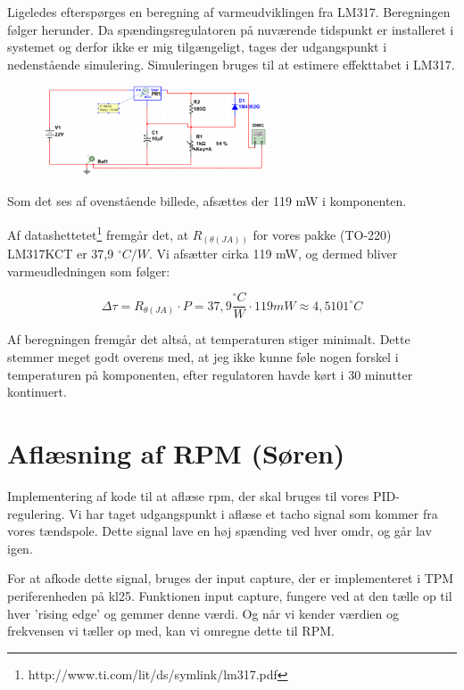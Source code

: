 Ligeledes efterspørges en beregning af varmeudviklingen fra LM317. Beregningen følger herunder. 
Da spændingsregulatoren på nuværende tidspunkt er installeret i systemet og derfor ikke er mig tilgængeligt, tages der udgangspunkt i nedenstående simulering. Simuleringen bruges til at estimere effekttabet i LM317. 

\begin{figure}[h]
  \centering
  \includegraphics[width=0.6\textwidth]{jbilx.png}
  \caption{}
  \label{fig:jbilx}
\end{figure}

Som det ses af ovenstående billede, afsættes der 119 mW i komponenten.

Af datashettetet\footnote{http://www.ti.com/lit/ds/symlink/lm317.pdf} fremgår det, at $R_(\theta(JA))$ for vores pakke (TO-220) LM317KCT er 37,9 $^\circ C/W$. Vi afsætter cirka 119 mW, og dermed bliver varmeudledningen som følger: 

\begin{equation}
  \label{eq:3}
  \Delta \tau = R_{\theta (JA)}\cdot P = 37,9 \frac{^\circ C}{W}\cdot 119mW\approx 4,5101 ^\circ C
\end{equation}

Af beregningen fremgår det altså, at temperaturen stiger minimalt. 
Dette stemmer meget godt overens med, at jeg ikke kunne føle nogen forskel i temperaturen på komponenten, efter regulatoren havde kørt i 30 minutter kontinuert. 

\clearpage
\section{Aflæsning af RPM (Søren)}
\label{sec:aflasning-af-rpm}

Implementering af kode til at aflæse rpm, der skal bruges til vores PID-regulering. Vi har taget udgangspunkt i aflæse et tacho signal som kommer fra vores tændspole. Dette signal lave en høj spænding ved hver omdr, og går lav igen. 

For at afkode dette signal, bruges der input capture, der er implementeret i TPM periferenheden på kl25. Funktionen input capture, fungere ved at den tælle op til hver ’rising edge’ og gemmer denne værdi. Og når vi kender værdien og frekvensen vi tæller op med, kan vi omregne dette til RPM. 

